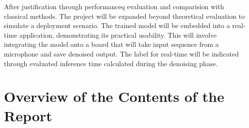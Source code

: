 After justification through performanceq evaluation and comparision with classical methods. The project will be expanded beyond theoretical evaluation to simulate a deployment scenario. The trained model will be embedded into a real-time application, demonstrating its practical usability. This will involve integrating the model onto a board that will take input sequence from a microphone and save denoised output. The label for real-time will be indicated through evaluated inference time calculated during the denoising phase.


\section{Overview of the Contents of the Report}